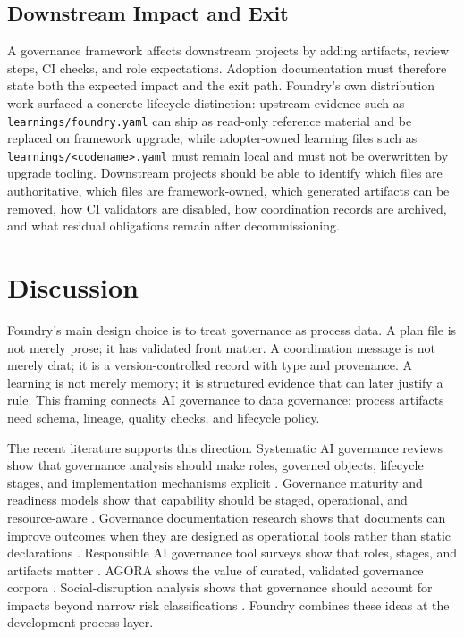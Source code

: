 \documentclass[conference]{IEEEtran}
\begin{document}
\subsection{Downstream Impact and Exit}

A governance framework affects downstream projects by adding artifacts, review steps, CI checks, and role expectations. Adoption documentation must therefore state both the expected impact and the exit path. Foundry's own distribution work surfaced a concrete lifecycle distinction: upstream evidence such as \texttt{learnings/foundry.yaml} can ship as read-only reference material and be replaced on framework upgrade, while adopter-owned learning files such as \texttt{learnings/<codename>.yaml} must remain local and must not be overwritten by upgrade tooling. Downstream projects should be able to identify which files are authoritative, which files are framework-owned, which generated artifacts can be removed, how CI validators are disabled, how coordination records are archived, and what residual obligations remain after decommissioning.

\section{Discussion}

Foundry's main design choice is to treat governance as process data. A plan file is not merely prose; it has validated front matter. A coordination message is not merely chat; it is a version-controlled record with type and provenance. A learning is not merely memory; it is structured evidence that can later justify a rule. This framing connects AI governance to data governance: process artifacts need schema, lineage, quality checks, and lifecycle policy.

The recent literature supports this direction. Systematic AI governance reviews show that governance analysis should make roles, governed objects, lifecycle stages, and implementation mechanisms explicit \cite{batool2025governance}. Governance maturity and readiness models show that capability should be staged, operational, and resource-aware \cite{hussein2026haira,kim2026ppto}. Governance documentation research shows that documents can improve outcomes when they are designed as operational tools rather than static declarations \cite{winecoff2025documentation}. Responsible AI governance tool surveys show that roles, stages, and artifacts matter \cite{kuehnert2025who}. AGORA shows the value of curated, validated governance corpora \cite{arnold2024agora}. Social-disruption analysis shows that governance should account for impacts beyond narrow risk classifications \cite{marchiori2025social}. Foundry combines these ideas at the development-process layer.
\end{document}
